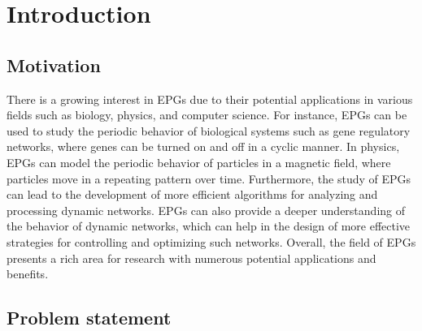 \chapter{Introduction}
\label{ch:Introduction}
\section{Motivation}
\label{ch:Introduction:sec:Motivation}
There is a growing interest in EPGs due to their potential applications in various fields such as biology, physics, and computer science. For instance, EPGs can be used to study the periodic behavior of biological systems such as gene regulatory networks, where genes can be turned on and off in a cyclic manner. In physics, EPGs can model the periodic behavior of particles in a magnetic field, where particles move in a repeating pattern over time. Furthermore, the study of EPGs can lead to the development of more efficient algorithms for analyzing and processing dynamic networks. EPGs can also provide a deeper understanding of the behavior of dynamic networks, which can help in the design of more effective strategies for controlling and optimizing such networks. Overall, the field of EPGs presents a rich area for research with numerous potential applications and benefits.
\section{Problem statement}
\label{ch:Introduction:sec:Problem statement}

